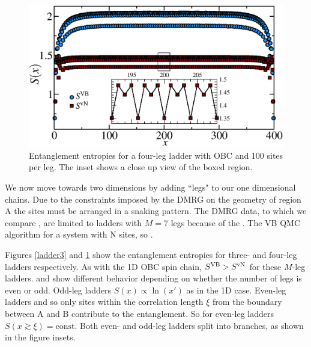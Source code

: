  \begin{figure} { \includegraphics[width=6in]{./figures/paper1/figure3/4-leg-ladder/4legfig.eps}
\caption[Entanglement entropies for a four-leg ladder]{
Entanglement entropies for a four-leg ladder with OBC and 100 sites per leg.  
The inset shows a close up view of the boxed region.  
 \label{ladder4} }} 
 \end{figure}
 
 We now move towards two dimensions by adding ``legs" to our one dimensional chains.
 Due to the constraints imposed by the DMRG on the geometry of region A the sites must be arranged in a snaking pattern. 
The DMRG data, to which we compare \vb, are limited to ladders with $M=7$ legs because of the .
 The VB QMC algorithm  for a system with N sites, so .
 
 Figures \ref{ladder3} and \ref{ladder4} show the entanglement entropies for three- and four-leg ladders respectively.
 As with the 1D OBC spin chain, $S^{\text{VB}} > S^{\text{vN}}$ for these $M$-leg ladders.
 \vn and \vb show different behavior depending on whether the number of legs is even or odd.
 Odd-leg ladders 
 $S(x) \propto \ln(x')$ as in the 1D case.
 Even-leg ladders  and so only sites within the correlation length $\xi$ from the boundary between A and B contribute to the entanglement.
So for even-leg ladders $S(x\gtrsim\xi) = \text{const}$.
Both even- and odd-leg ladders split into branches, as shown in the figure insets.
  
 
